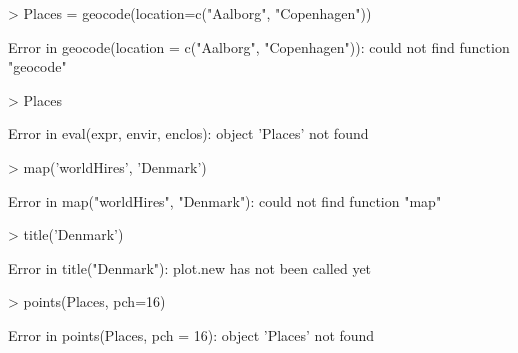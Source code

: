 \begin{Schunk}
\begin{Sinput}
> Places = geocode(location=c("Aalborg", "Copenhagen")) 
\end{Sinput}
\begin{Soutput}
Error in geocode(location = c("Aalborg", "Copenhagen")): could not find function "geocode"
\end{Soutput}
\begin{Sinput}
> Places 
\end{Sinput}
\begin{Soutput}
Error in eval(expr, envir, enclos): object 'Places' not found
\end{Soutput}
\begin{Sinput}
> map('worldHires', 'Denmark') 
\end{Sinput}
\begin{Soutput}
Error in map("worldHires", "Denmark"): could not find function "map"
\end{Soutput}
\begin{Sinput}
> title('Denmark') 
\end{Sinput}
\begin{Soutput}
Error in title("Denmark"): plot.new has not been called yet
\end{Soutput}
\begin{Sinput}
> points(Places, pch=16) 
\end{Sinput}
\begin{Soutput}
Error in points(Places, pch = 16): object 'Places' not found
\end{Soutput}
\end{Schunk}

